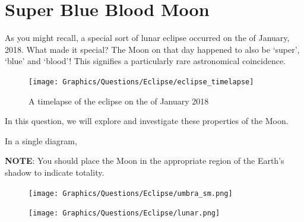 \documentclass[a4paper,11pt,draft]{exam}
\begin{document}
\section{Super Blue Blood Moon}
As you might recall, a special sort of lunar eclipse occurred on the  of January, 2018. What made it special? The Moon on that day happened to also be `super', `blue' and `blood'! This signifies a particularly rare astronomical coincidence. \begin{figure}[H]
	\centering
	\texttt{[image: Graphics/Questions/Eclipse/eclipse\_timelapse]}
	\caption{A timelapse of the eclipse on the  of January 2018}
	\label{q3}
\end{figure}
In this question, we will explore and investigate these properties of the Moon. 
\begin{questions}
\question[1]\label{q3a}
	In a single diagram, 
	\textbf{NOTE}: You should place the Moon in the appropriate region of the Earth’s shadow to indicate totality.
	\begin{solution}
		\begin{figure}[H]
			\centering
			\texttt{[image: Graphics/Questions/Eclipse/umbra\_sm.png]}
		\end{figure}
		\begin{figure}[H]
			\centering
			\texttt{[image: Graphics/Questions/Eclipse/lunar.png]}
		\end{figure}
	\end{solution}
	
\end{questions}
\end{document}
